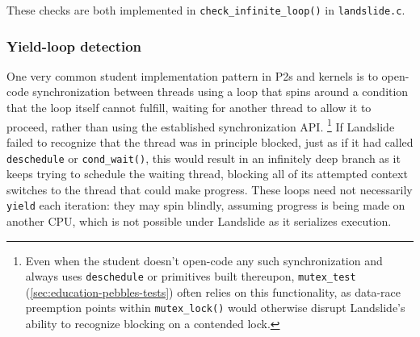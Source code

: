 These checks are both implemented in {\tt check\_infinite\_loop()} in {\tt landslide.c}.

\subsubsection{Yield-loop detection}
\label{sec:landslide-blocking-yield}

One very common student implementation pattern in P2s and kernels is to open-code
synchronization between threads using a loop that spins around a condition that the loop itself cannot fulfill,
waiting for another thread to allow it to proceed,
rather than using the established synchronization API.%
\footnote{Even when the student doesn't open-code any such synchronization and always uses {\tt deschedule}
or primitives built thereupon,
{\tt mutex\_test} (\cref{sec:education-pebbles-tests})
often relies on this functionality, as data-race preemption points within {\tt mutex\_lock()}
would otherwise disrupt Landslide's ability to recognize blocking on a contended lock.}
If Landslide failed to recognize that the thread was in principle blocked,
just as if it had called {\tt deschedule} or {\tt cond\_wait()},
this would result in an infinitely deep branch
as it keeps trying to schedule the waiting thread,
blocking all of its attempted context switches to the thread that could make progress.
These loops need not necessarily {\tt yield} each iteration:
they may spin blindly,
assuming progress is being made on another CPU,
which is not possible under Landslide as it serializes execution.

